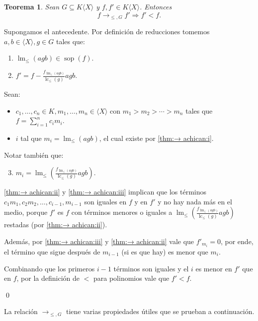 \documentclass[12pt]{report}
\theoremstyle{customstyle}
\newtheorem{theorem}{Teorema}[chapter]
\renewenvironment{proof}[1][\proofname]{{\noindent \bfseries #1: }}{\qed} %
\theoremstyle{factstyle}
\DeclareMathOperator{\sop}{sop}
\DeclareMathOperator{\lm}{lm}
\DeclareMathOperator{\lc}{lc}
\begin{document}
\begin{theorem}\label{thm:→ achican}
  Sean $G ⊆ K⟨X⟩$ y $f, f' ∈ K⟨X⟩$. Entonces
  \[ f →_{≤, G} f' ⇒ f' < f \text{.} \]
\end{theorem}
\begin{proof}
  Supongamos el antecedente. Por definición de reducciones tomemos $a, b ∈ ⟨X⟩, g ∈ G$ tales que:
  \begin{enumerate}[label=(\roman*)]
    \item $\lm_≤(agb) ∈ \sop(f)$. \label{thm:→ achican:i}
    \item $f' = f - \frac{f_{\lm_≤(agb)}}{\lc_≤(g)}agb$. \label{thm:→ achican:ii}
  \end{enumerate}

  Sean:
  \begin{itemize}
    \item $c_1, …, c_n ∈ K, m_1, …, m_n ∈ ⟨X⟩$ con $m_1 > m_2 > ⋯ > m_n$ tales que $f = ∑_{i = 1}^n c_i m_i$.
    \item $i$ tal que $m_i = \lm_≤(agb)$, el cual existe por \ref{thm:→ achican:i}.
  \end{itemize}

  Notar también que:

  \begin{enumerate}[label=(\roman*)]
    \setcounter{enumi}{2}
    \item $m_i = \lm_≤(\frac{f_{\lm_≤(agb)}}{\lc_≤(g)}agb)$. \label{thm:→ achican:iii}
  \end{enumerate}

  \ref{thm:→ achican:ii} y \ref{thm:→ achican:iii} implican que los términos $c_1 m_1, c_2 m_2, …, c_{i-1}, m_{i-1}$ son iguales en $f$ y en $f'$ y no hay nada más en el medio, porque $f'$ es $f$ con términos menores o iguales a $\lm_≤(\frac{f_{\lm_≤(agb)}}{\lc_≤(g)}agb)$ restadas (por \ref{thm:→ achican:ii}).

  Además, por \ref{thm:→ achican:iii} y \ref{thm:→ achican:ii} vale que $f'_{m_i} = 0$, por ende, el término que sigue después de $m_{i-1}$ (si es que hay) es menor que $m_i$.

  Combinando que los primeros $i - 1$ términos son iguales y el $i$ es menor en $f'$ que en $f$, por la definición de $<$ para polinomios vale que $f' < f$.

\end{proof}

La relación $→_{≤, G}$ tiene varias propiedades útiles que se prueban a continuación.
\end{document}
